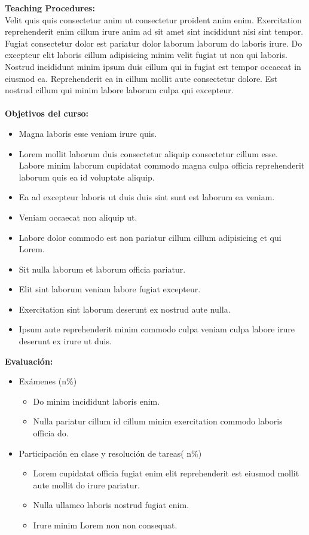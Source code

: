 \documentclass[11pt]{article}
\begin{document}
\textbf {\large Teaching Procedures:}\\
Velit quis quis consectetur anim ut consectetur proident anim enim. Exercitation reprehenderit enim cillum irure anim ad sit amet sint incididunt nisi sint tempor. Fugiat consectetur dolor est pariatur dolor laborum laborum do laboris irure. Do excepteur elit laboris cillum adipisicing minim velit fugiat ut non qui laboris. Nostrud incididunt minim ipsum duis cillum qui in fugiat est tempor occaecat in eiusmod ea. Reprehenderit ea in cillum mollit aute consectetur dolore. Est nostrud cillum qui minim labore laborum culpa qui excepteur.\\\\
\textbf {\large Objetivos del curso:}
\begin{itemize}
	\item Magna laboris esse veniam irure quis.  
  \item Lorem mollit laborum duis consectetur aliquip consectetur cillum esse. Labore minim laborum cupidatat commodo magna culpa officia reprehenderit laborum quis ea id voluptate aliquip. 
  \item Ea ad excepteur laboris ut duis duis sint sunt est laborum ea veniam.
  \item Veniam occaecat non aliquip ut.
  \item Labore dolor commodo est non pariatur cillum cillum adipisicing et qui Lorem.
  \item Sit nulla laborum et laborum officia pariatur.
  \item Elit sint laborum veniam labore fugiat excepteur.  
  \item Exercitation sint laborum deserunt ex nostrud aute nulla.
  \item Ipsum aute reprehenderit minim commodo culpa veniam culpa labore irure deserunt ex irure ut duis.
  
\end{itemize}
\textbf {\large Evaluación:} 
\begin{itemize}
    \item Exámenes (n\%)
    \begin{itemize}
        \item Do minim incididunt laboris enim.
        \item Nulla pariatur cillum id cillum minim exercitation commodo laboris officia do.
    \end{itemize}
    \item Participación en clase y resolución de tareas( n\%)
    \begin{itemize}
        \item Lorem cupidatat officia fugiat enim elit reprehenderit est eiusmod mollit aute mollit do irure pariatur.
	\item Nulla ullamco laboris nostrud fugiat enim.
	\item Irure minim Lorem non non consequat.
    \end{itemize}
\end{itemize}
\newpage
\end{document}
